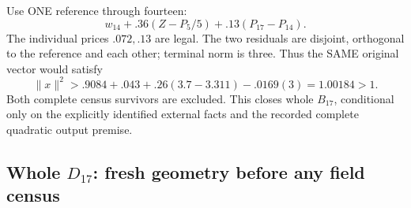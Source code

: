 \documentclass[11pt]{article}
\begin{document}
Use ONE reference through fourteen:
\[
                   w_{14}+.36(Z-P_5/5)+.13(P_{17}-P_{14}).
\]
The individual prices \(.072,.13\) are legal.
The two residuals are disjoint, orthogonal to
the reference and each other; terminal norm is three.
Thus the SAME original vector would satisfy
\[
 \|x\|^2>.9084+.043+.26(3.7-3.311)-.0169(3)
                              =1.00184>1 .
\]
Both complete census survivors are excluded.
This closes whole \(B_{17}\), conditional only
on the explicitly identified external facts and
the recorded complete quadratic output premise.

\subsection[Whole D17: fresh geometry before any field census]{Whole \(D_{17}\): fresh geometry before any field census}
\label{app:arithD17geometry}
\end{document}
